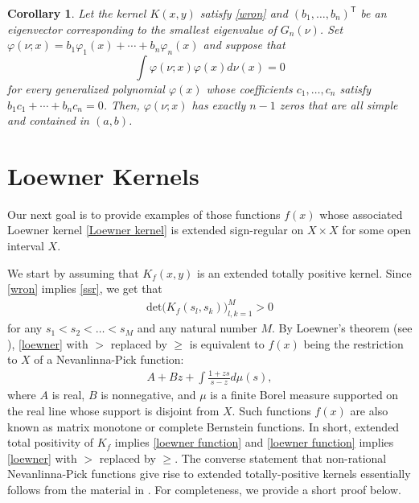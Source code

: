 \documentclass[twoside,a4paper]{amsart}
\renewcommand{\det}{\mathrm{det}}
\newtheorem{corollary}[theorem]{Corollary}
\theoremstyle{remark}
\begin{document}
\begin{corollary}
\label{cor:ortho} Let  the kernel \( K(x,y) \) satisfy \eqref{wron}
 and  \( (b_1,\ldots,b_n)^\mathsf{T} \) be an eigenvector corresponding to the smallest eigenvalue of \( G_n(\nu) \). Set
$
\varphi(\nu;x) = b_1\varphi_1(x) + \cdots + b_n\varphi_n(x)
$
and suppose that
\[
\int \varphi(\nu;x)\varphi(x) d\nu(x) =0
\]
for every generalized polynomial $\varphi(x)$ whose coefficients $c_1,\ldots,c_n$ satisfy $b_1c_1 + \cdots + b_nc_n =0$.
Then, \( \varphi(\nu;x) \) has exactly \( n-1 \)  zeros that are all simple and contained in \( (a,b) \).
\end{corollary}

\section{Loewner Kernels}
\label{sec:loewner}

Our next goal is to provide examples of those functions \( f(x) \) whose associated Loewner kernel \eqref{Loewner kernel} is extended sign-regular on \( X\times X \) for some open interval \( X \).

We start by assuming that $K_f(x,y)$ is an extended totally positive kernel. Since \eqref{wron} implies \eqref{ssr}, we get that
\begin{align}
\label{loewner}
\det\big(  K_f(s_l,s_k) \big)_{l,k=1}^M >0    
\end{align}
for any \( s_1<s_2<\ldots<s_M \) and any natural number \( M \). By Loewner's theorem (see \cite[Theorems~1.6 and 5.1]{Simon}), \eqref{loewner} with \( > \) replaced by \( \geq  \) is equivalent    to \( f(x) \) being the restriction to \( X \) of a Nevanlinna-Pick function:
\begin{align}
\label{loewner function}
A+ Bz + \int\frac{1+zs}{s-z}d\mu(s),
\end{align}
where \( A \) is real, \( B \) is nonnegative, and \( \mu \) is a finite Borel measure supported on the real line whose support is disjoint from \( X \). Such functions \( f(x) \) are also known as matrix monotone or complete Bernstein functions. In short, extended total positivity of $K_f$ implies \eqref{loewner function} and \eqref{loewner function} implies \eqref{loewner} with \( > \) replaced by \( \geq  \). The converse statement that non-rational Nevanlinna-Pick functions give rise to extended totally-positive kernels essentially follows from the material in \cite[Section~3.1]{Karlin}. For completeness, we provide a short proof below.
\end{document}

